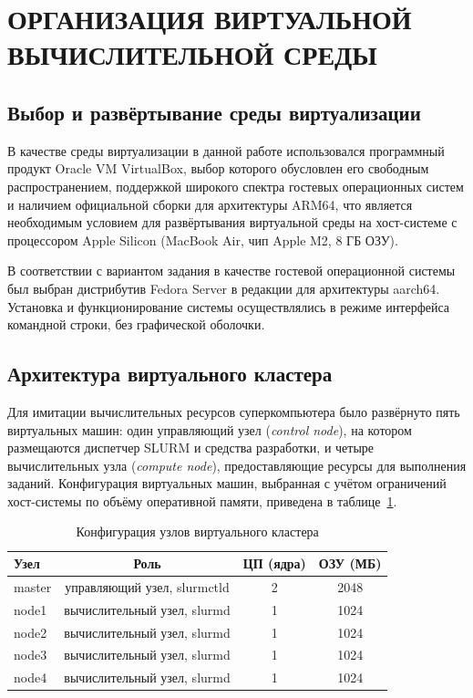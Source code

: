 \newpage
\section{ОРГАНИЗАЦИЯ ВИРТУАЛЬНОЙ ВЫЧИСЛИТЕЛЬНОЙ СРЕДЫ}

\subsection{Выбор и развёртывание среды виртуализации}

В качестве среды виртуализации в данной работе использовался
программный продукт Oracle VM VirtualBox, выбор которого обусловлен
его свободным распространением, поддержкой широкого спектра
гостевых операционных систем и наличием официальной сборки для
архитектуры ARM64, что является необходимым условием для
развёртывания виртуальной среды на хост-системе с процессором Apple
Silicon (MacBook Air, чип Apple M2, 8 ГБ ОЗУ).

В соответствии с вариантом задания в качестве гостевой операционной
системы был выбран дистрибутив Fedora Server в редакции для
архитектуры aarch64. Установка и функционирование системы
осуществлялись в режиме интерфейса командной строки, без
графической оболочки.

\subsection{Архитектура виртуального кластера}

Для имитации вычислительных ресурсов суперкомпьютера было развёрнуто
пять виртуальных машин: один управляющий узел (\textit{control
node}), на котором размещаются диспетчер SLURM и средства разработки,
и четыре вычислительных узла (\textit{compute node}), предоставляющие
ресурсы для выполнения заданий. Конфигурация виртуальных машин,
выбранная с учётом ограничений хост-системы по объёму оперативной
памяти, приведена в таблице~\ref{tab:nodes_config}.

\begin{table}[H]
\caption{Конфигурация узлов виртуального кластера}
\label{tab:nodes_config}
\centering
\begin{tabular}{|l|c|c|c|}
\hline
Узел & Роль & ЦП (ядра) & ОЗУ (МБ) \\
\hline
master & управляющий узел, slurmctld & 2 & 2048 \\
node1 & вычислительный узел, slurmd & 1 & 1024 \\
node2 & вычислительный узел, slurmd & 1 & 1024 \\
node3 & вычислительный узел, slurmd & 1 & 1024 \\
node4 & вычислительный узел, slurmd & 1 & 1024 \\
\hline
\end{tabular}
\end{table}


